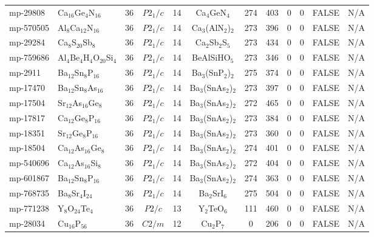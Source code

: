 {\begin{longtable}{llcccccccccc}
    mp-29808 & Ca$_{16}$Ge$_{4}$N$_{16}$ & 36    & $P2_1/c$ & 14    & Ca$_{4}$GeN$_{4}$ & 274   & 403   & 0     & 0     & FALSE & N/A \\
    mp-570505 & Al$_{8}$Ca$_{12}$N$_{16}$ & 36    & $P2_1/c$ & 14    & Ca$_{3}$(AlN$_{2}$)$_{2}$ & 273   & 396   & 0     & 0     & FALSE & N/A \\
    mp-29284 & Ca$_{8}$S$_{20}$Sb$_{8}$ & 36    & $P2_1/c$ & 14    & Ca$_{2}$Sb$_{2}$S$_{5}$ & 273   & 434   & 0     & 0     & FALSE & N/A \\
    mp-759686 & Al$_{4}$Be$_{4}$H$_{4}$O$_{20}$Si$_{4}$ & 36    & $P2_1/c$ & 14    & BeAlSiHO$_{5}$ & 273   & 346   & 0     & 0     & FALSE & N/A \\
    mp-2911 & Ba$_{12}$Sn$_{8}$P$_{16}$ & 36    & $P2_1/c$ & 14    & Ba$_{3}$(SnP$_{2}$)$_{2}$ & 275   & 374   & 0     & 0     & FALSE & N/A \\
    mp-17470 & Ba$_{12}$Sn$_{8}$As$_{16}$ & 36    & $P2_1/c$ & 14    & Ba$_{3}$(SnAs$_{2}$)$_{2}$ & 273   & 397   & 0     & 0     & FALSE & N/A \\
    mp-17504 & Sr$_{12}$As$_{16}$Ge$_{8}$ & 36    & $P2_1/c$ & 14    & Ba$_{3}$(SnAs$_{2}$)$_{2}$ & 272   & 465   & 0     & 0     & FALSE & N/A \\
    mp-17817 & Ca$_{12}$Ge$_{8}$P$_{16}$ & 36    & $P2_1/c$ & 14    & Ba$_{3}$(SnAs$_{2}$)$_{2}$ & 273   & 384   & 0     & 0     & FALSE & N/A \\
    mp-18351 & Sr$_{12}$Ge$_{8}$P$_{16}$ & 36    & $P2_1/c$ & 14    & Ba$_{3}$(SnAs$_{2}$)$_{2}$ & 273   & 360   & 0     & 0     & FALSE & N/A \\
    mp-18504 & Ca$_{12}$As$_{16}$Ge$_{8}$ & 36    & $P2_1/c$ & 14    & Ba$_{3}$(SnAs$_{2}$)$_{2}$ & 274   & 401   & 0     & 0     & FALSE & N/A \\
    mp-540696 & Ca$_{12}$As$_{16}$Si$_{8}$ & 36    & $P2_1/c$ & 14    & Ba$_{3}$(SnAs$_{2}$)$_{2}$ & 272   & 404   & 0     & 0     & FALSE & N/A \\
    mp-601867 & Ba$_{12}$Sn$_{8}$P$_{16}$ & 36    & $P2_1/c$ & 14    & Ba$_{3}$(SnAs$_{2}$)$_{2}$ & 274   & 363   & 0     & 0     & FALSE & N/A \\
    mp-768735 & Ba$_{8}$Sr$_{4}$I$_{24}$ & 36    & $P2_1/c$ & 14    & Ba$_{2}$SrI$_{6}$ & 275   & 504   & 0     & 0     & FALSE & N/A \\
    mp-771238 & Y$_{8}$O$_{24}$Te$_{4}$ & 36    & $P2/c$ & 13    & Y$_{2}$TeO$_{6}$ & 111   & 460   & 0     & 0     & FALSE & N/A \\
    mp-28034 & Cu$_{16}$P$_{56}$ & 36    & $C2/m$ & 12    & Cu$_{2}$P$_{7}$ & 0     & 206   & 0     & 0     & FALSE & N/A \\

\end{longtable}}
